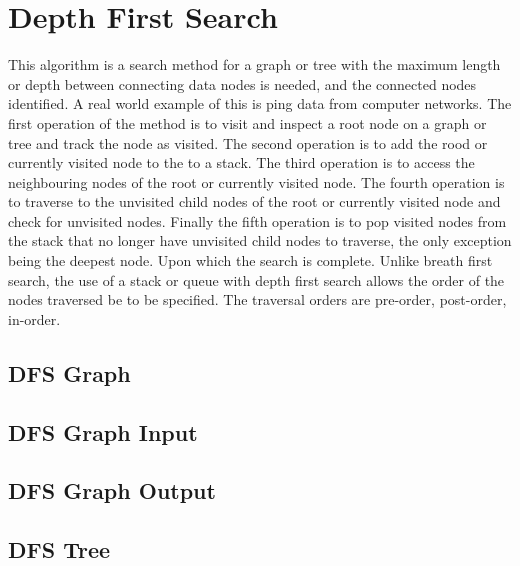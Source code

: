 \section{Depth First Search}
This algorithm is a search method for a graph or tree with the maximum length or depth between connecting data nodes is needed, and the connected nodes identified. 
A real world example of this is ping data from computer networks. 
The first operation of the method is to visit and inspect a root node on a graph or tree and track the node as visited.
The second operation is to add the rood or currently visited node to the to a stack.
The third operation is to access the neighbouring nodes of the root or currently visited node.
The fourth operation is to traverse to the unvisited child nodes of the root or currently visited node and check for unvisited nodes. 
Finally the fifth operation is to pop visited nodes from the stack that no longer have unvisited child nodes to traverse, the only exception being the deepest node.
Upon which the search is complete.
Unlike breath first search, the use of a stack or queue with depth first search allows the order of the nodes traversed be to be specified.
The traversal orders are pre-order, post-order, in-order.    
 
\subsection{DFS Graph}

\subsection{DFS Graph Input}

\subsection{DFS Graph Output}

\subsection{DFS Tree}

